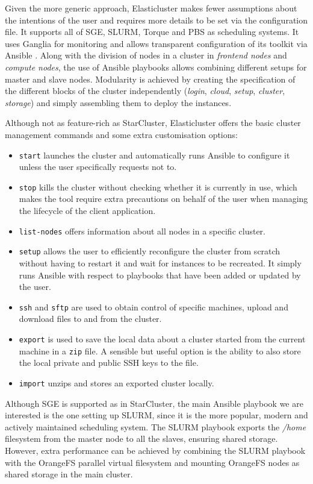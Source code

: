 Given the more generic approach, Elasticluster makes fewer assumptions about the intentions of the user and requires more details to be set via the configuration file. It supports all of SGE, SLURM, Torque and PBS as scheduling systems. It uses Ganglia \cite{Ganglia} for monitoring and allows transparent configuration of its toolkit via Ansible \cite{Ansible}. Along with the division of nodes in a cluster in \textit{frontend nodes} and \textit{compute nodes}, the use of Ansible playbooks allows combining different setups for master and slave nodes. Modularity is achieved by creating the specification of the different blocks of the cluster independently (\textit{login}, \textit{cloud}, \textit{setup}, \textit{cluster}, \textit{storage}) and simply assembling them to deploy the instances.

Although not as feature-rich as StarCluster, Elasticluster offers the basic cluster management commands and some extra customisation options:
\begin{itemize}
	\item \verb|start| launches the cluster and automatically runs Ansible to configure it unless the user specifically requests not to.
	\item \verb|stop| kills the cluster without checking whether it is currently in use, which makes the tool require extra precautions on behalf of the user when managing the lifecycle of the client application.
	\item \verb|list-nodes| offers information about all nodes in a specific cluster.
	\item \verb|setup| allows the user to efficiently reconfigure the cluster from scratch without having to restart it and wait for instances to be recreated. It simply runs Ansible with respect to playbooks that have been added or updated by the user.
	\item \verb|ssh| and \verb|sftp| are used to obtain control of specific machines, upload and download files to and from the 
cluster.
	\item \verb|export| is used to save the local data about a cluster started from the current machine in a \verb|zip| file. A sensible but useful option is the ability to also store the local private and public SSH keys to the file.
	\item \verb|import| unzips and stores an exported cluster locally.
\end{itemize}

Although SGE is supported as in StarCluster, the main Ansible playbook we are interested is the one setting up SLURM, since it is the more popular, modern and actively maintained scheduling system. The SLURM playbook exports the \textit{/home} filesystem from the master node to all the slaves, ensuring shared storage. However, extra performance can be achieved by combining the SLURM playbook with the OrangeFS parallel virtual filesystem and mounting OrangeFS nodes as shared storage in the main cluster.

